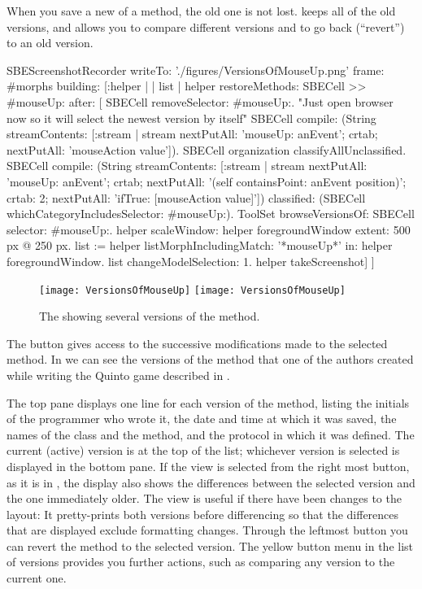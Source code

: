 \documentclass[a4paper,10pt,twoside]{book}
\begin{document}
When you save a new  of a method, the old one is not lost.
\sq keeps all of the old versions, and allows you to compare different versions and to go back (``revert'') to an old version.

\begin{ExecuteSmalltalkScript}
SBEScreenshotRecorder writeTo: './figures/VersionsOfMouseUp.png' frame: #morphs building: [:helper |
	| list |
	helper restoreMethods: {SBECell >> #mouseUp:} after: [
		SBECell removeSelector: #mouseUp:.
		"Just open browser now so it will select the newest version by itself"
		SBECell
			compile: (String streamContents: [:stream | stream
				nextPutAll: 'mouseUp: anEvent';
				crtab; nextPutAll: 'mouseAction value']).
		SBECell organization classifyAllUnclassified.
		SBECell
			compile: (String streamContents: [:stream | stream
				nextPutAll: 'mouseUp: anEvent';
				crtab; nextPutAll: '(self containsPoint: anEvent position)';
				crtab: 2; nextPutAll: 'ifTrue: [mouseAction value]'])
			classified: (SBECell whichCategoryIncludesSelector: #mouseUp:).
		ToolSet browseVersionsOf: SBECell selector: #mouseUp:.
		helper scaleWindow: helper foregroundWindow extent: 500 px @ 250 px.
		list := helper listMorphIncludingMatch: '*mouseUp*' in: helper foregroundWindow.
		list changeModelSelection: 1.
		helper takeScreenshot]
]
\end{ExecuteSmalltalkScript}
\begin{figure}[btp]
   \centering
   \ifluluelse
	   {\texttt{[image: VersionsOfMouseUp]} }
	   {\texttt{[image: VersionsOfMouseUp]} }
   \caption{The  showing several versions of the  method.}
   \label{fig:mouseUpVersions}
\end{figure}
The  button gives access to the successive modifications made to the selected method.
In  we can see the versions of the  method that one of the authors created while writing the Quinto game described in .

The top pane displays one line for each version of the method, listing the initials of the programmer who wrote it, the date and time at which it was saved, the names of the class and the method, and the protocol in which it was defined.
The current (active) version is at the top of the list; whichever version is selected is displayed in the bottom pane.
If the  view is selected from the right most button, as it is in , the display also shows the differences between the selected version and the one immediately older.
The  view is useful if there have been changes to the layout: It pretty-prints both versions before differencing so that the differences that are displayed exclude formatting changes.
Through the leftmost button you can revert the method to the selected version.
The yellow button menu in the list of versions provides you further actions, such as comparing any version to the current one.
\end{document}
